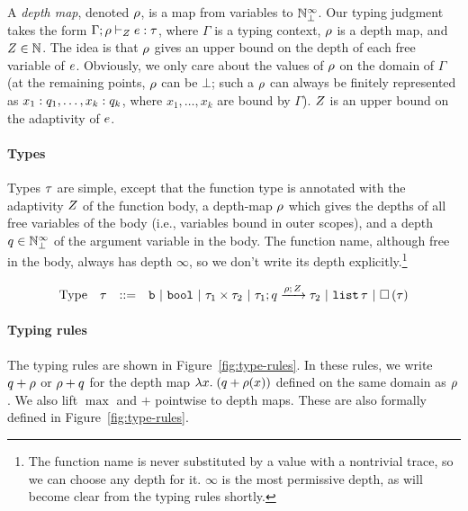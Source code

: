 \documentclass[a4paper,11pt]{article}
\theoremstyle{definition}
\begin{document}
A \emph{depth map}, denoted $\rho$, is a map from variables to
$\mathbb{N}_{\bot}^\infty$.
%
%
Our typing judgment takes the form $\Gamma; \rho \vdash_{Z}
e: \tau$, where $\Gamma$ is a typing context, $\rho$ is a depth
map, and $Z \in \mathbb{N}$. The idea is that $\rho$ gives an upper
bound on the depth of each free variable of $e$. Obviously, we
only care about the values of $\rho$ on the domain of $\Gamma$ (at
the remaining points, $\rho$ can be $\bot$; such a $\rho$ can always
be finitely represented as $x_1: q_1, \ldots, x_k: q_k$,
where $x_1,\ldots,x_k$ are bound by $\Gamma$). $Z$ is an upper
bound on the adaptivity of $e$.

\paragraph{Types}
Types $\tau$ are simple, except that the function type is annotated
with the adaptivity $Z$ of the function body, a depth-map $\rho$
which gives the depths of all free variables of the body (i.e.,
variables bound in outer scopes), and a depth $q \in \mathbb{N}_{\bot}^\infty$ of
the argument variable in the body. The function name, although free in
the body, always has depth $\infty$, so we don't write its depth
explicitly.\footnote{The function name is never substituted by a value
  with a nontrivial trace, so we can choose any depth for it. $\infty$
  is the most permissive depth, as will become clear from the typing
  rules shortly.}

\[
\begin{array}{llll}
  \mbox{Type} & \tau & ::= & \mathtt{b} ~|~ \mathtt{bool} ~|~ \tau_1 \times
  \tau_2 ~|~ \tau_1; q \xrightarrow{\rho; \, Z} \tau_2 ~|~
                              \mathtt{list} \, \tau ~|~ \mathtt{\square} \, (\tau)
\end{array}
\]


\paragraph{Typing rules}
The typing rules are shown in Figure~\ref{fig:type-rules}. In these
rules, we write $q + \rho$ or $\rho + q$ for the depth
map $\lambda x.\;  (q + \rho(x))$ defined on the same domain as
$\rho$. We also lift $\max$ and $+$ pointwise to depth maps.
These are also formally defined in Figure~\ref{fig:type-rules}.
\end{document}
